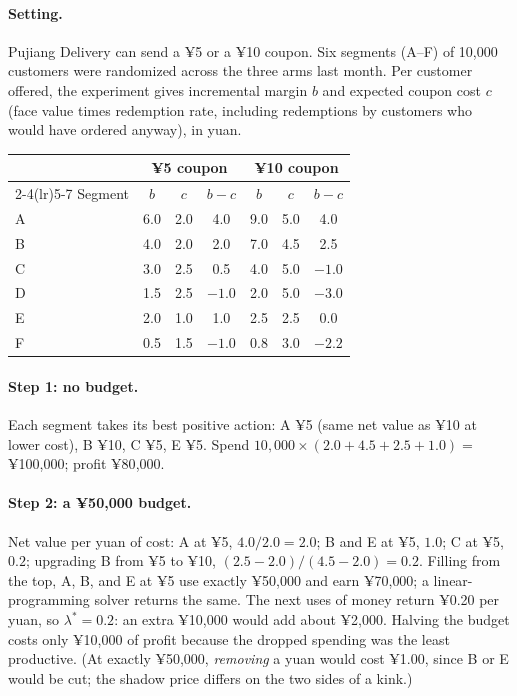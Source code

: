 \documentclass[11pt]{article}
\begin{document}
\paragraph{Setting.} Pujiang Delivery can send a ¥5 or a ¥10 coupon. Six segments (A--F) of 10{,}000 customers were randomized
across the three arms last month. Per customer offered, the experiment gives incremental margin $b$ and expected coupon
cost $c$ (face value times redemption rate, including redemptions by customers who would have ordered anyway), in yuan.
\begin{center}
\begin{tabular}{lcccccc}
\toprule
& \multicolumn{3}{c}{¥5 coupon} & \multicolumn{3}{c}{¥10 coupon} \\
\cmidrule(lr){2-4}\cmidrule(lr){5-7}
Segment & $b$ & $c$ & $b - c$ & $b$ & $c$ & $b - c$ \\
\midrule
A & 6.0 & 2.0 & 4.0 & 9.0 & 5.0 & 4.0 \\
B & 4.0 & 2.0 & 2.0 & 7.0 & 4.5 & 2.5 \\
C & 3.0 & 2.5 & 0.5 & 4.0 & 5.0 & $-1.0$ \\
D & 1.5 & 2.5 & $-1.0$ & 2.0 & 5.0 & $-3.0$ \\
E & 2.0 & 1.0 & 1.0 & 2.5 & 2.5 & 0.0 \\
F & 0.5 & 1.5 & $-1.0$ & 0.8 & 3.0 & $-2.2$ \\
\bottomrule
\end{tabular}
\end{center}

\paragraph{Step 1: no budget.} Each segment takes its best positive action: A ¥5 (same net value as ¥10 at lower cost), B ¥10,
C ¥5, E ¥5. Spend $10{,}000 \times (2.0 + 4.5 + 2.5 + 1.0) = $ ¥100{,}000; profit ¥80{,}000.

\paragraph{Step 2: a ¥50{,}000 budget.} Net value per yuan of cost: A at ¥5, $4.0/2.0 = 2.0$; B and E at ¥5, $1.0$; C at ¥5, $0.2$;
upgrading B from ¥5 to ¥10, $(2.5 - 2.0)/(4.5 - 2.0) = 0.2$. Filling from the top, A, B, and E at ¥5 use exactly ¥50{,}000 and earn
¥70{,}000; a linear-programming solver returns the same. The next uses of money return ¥0.20 per yuan, so
$\lambda^\ast = 0.2$: an extra ¥10{,}000 would add about ¥2{,}000. Halving the budget costs only ¥10{,}000 of profit because the
dropped spending was the least productive. (At exactly ¥50{,}000, \emph{removing} a yuan would cost ¥1.00, since B or E would be
cut; the shadow price differs on the two sides of a kink.)
\end{document}
